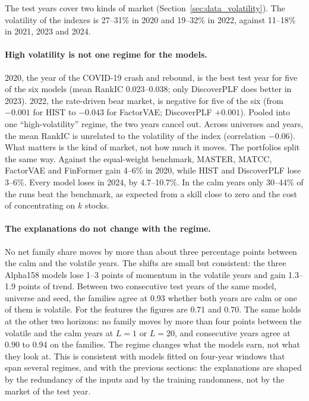 The test years cover two kinds of market (Section~\ref{sec:data_volatility}). The volatility of the indexes is 27--31\% in 2020 and 19--32\% in 2022, against 11--18\% in 2021, 2023 and 2024.

\paragraph{High volatility is not one regime for the models.} 2020, the year of the COVID-19 crash and rebound, is the best test year for five of the six models (mean RankIC 0.023--0.038; only DiscoverPLF does better in 2023). 2022, the rate-driven bear market, is negative for five of the six (from $-0.001$ for HIST to $-0.043$ for FactorVAE; DiscoverPLF $+0.001$). Pooled into one ``high-volatility'' regime, the two years cancel out. Across universes and years, the mean RankIC is unrelated to the volatility of the index (correlation $-0.06$). What matters is the kind of market, not how much it moves. The portfolios split the same way. Against the equal-weight benchmark, MASTER, MATCC, FactorVAE and FinFormer gain 4--6\% in 2020, while HIST and DiscoverPLF lose 3--6\%. Every model loses in 2024, by 4.7--10.7\%. In the calm years only 30--44\% of the runs beat the benchmark, as expected from a skill close to zero and the cost of concentrating on $k$ stocks.

\paragraph{The explanations do not change with the regime.} No net family share moves by more than about three percentage points between the calm and the volatile years. The shifts are small but consistent: the three Alpha158 models lose 1--3 points of momentum in the volatile years and gain 1.3--1.9 points of trend. Between two consecutive test years of the same model, universe and seed, the families agree at 0.93 whether both years are calm or one of them is volatile. For the features the figures are 0.71 and 0.70. The same holds at the other two horizons: no family moves by more than four points between the volatile and the calm years at $L = 1$ or $L = 20$, and consecutive years agree at 0.90 to 0.94 on the families. The regime changes what the models earn, not what they look at. This is consistent with models fitted on four-year windows that span several regimes, and with the previous sections: the explanations are shaped by the redundancy of the inputs and by the training randomness, not by the market of the test year.

